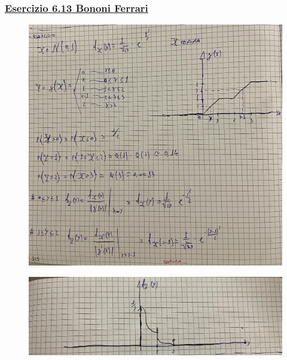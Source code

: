 \documentclass{article}
\begin{document}
\subsubsection{\underline{Esercizio 6.13 Bononi Ferrari}}
\begin{figure}[ht]
\centering
\includegraphics[scale=0.10]{ese/33.jpeg}
\end{figure}
\begin{figure}[ht]
\centering
\includegraphics[scale=0.10]{ese/33a.jpeg}
\end{figure}
\end{document}
